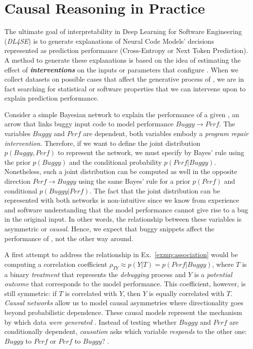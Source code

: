 \section{Causal Reasoning in Practice}
\label{sec:ci4se}

The ultimate goal of interpretability in Deep Learning for Software Engineering (\textit{DL4SE}) is to generate explanations of Neural Code Models' decisions represented as prediction performance (\ie Cross-Entropy or Next Token Prediction). A method to generate these explanations is based on the idea of estimating the effect of \textbf{\textit{interventions}} on the inputs or parameters that configure \nlms. When we collect datasets on possible cases that affect the generative process of \nlms, we are in fact searching for statistical or software properties that we can intervene upon to explain prediction performance. 

\begin{exmp}
\label{exmp:association}
Consider a simple Bayesian network to explain the performance of a given \nlm, an arrow that links buggy input code to model performance $Buggy\to Perf$. The variables $Buggy$ and $Perf$ are dependent, both variables embody a \textit{program repair intervention}. Therefore, if we want to define the joint distribution $p(Buggy,Perf)$ to represent the network, we must specify by Bayes' rule using the prior $p(Buggy)$ and the conditional probability $p(Perf|Buggy)$. Nonetheless, such a joint distribution can be computed as well in the opposite direction  $Perf\to Buggy$ using the same Bayes' rule for a prior $p(Perf)$ and conditional $p(Buggy|Perf)$. The fact that the joint distribution can be represented with both networks is non-intuitive since we know from experience and software understanding that the model performance cannot give rise to a bug in the original input. In other words, the relationship between these variables is asymmetric or \textit{causal}. Hence, we expect that buggy snippets affect the performance of \nlms, not the other way around.
\end{exmp}

A first attempt to address the relationship in Ex.~\ref{exmp:association} would be computing a correlation coefficient $\rho_{TY}\approx p(Y|T)=p(Perf|Buggy)$, where $T$ is a binary \textit{treatment} that represents the \textit{debugging} process and $Y$ is a \textit{potential outcome} that corresponds to the model performance. This coefficient, however, is still symmetric: if $T$ is correlated with $Y$, then $Y$ is equally correlated with $T$. \textit{Causal networks} allow us to model causal asymmetries where directionality goes beyond probabilistic dependence. These causal models represent the mechanism by which data \textit{were generated} \cite{Pearl2016Causality}. Instead of testing whether $Buggy$ and $Perf$ are conditionally dependent, \textit{causation} asks which variable \textit{responds} to the other one: $Buggy$ to $Perf$ or $Perf$ to $Buggy$? \cite{Pearl2016Causality}.

